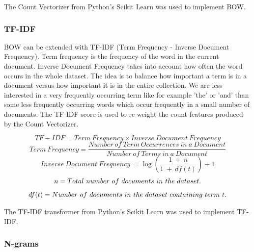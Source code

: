 The Count Vectorizer from Python's Scikit Learn was used to implement BOW. 

\subsubsection{TF-IDF}

BOW can be extended with TF-IDF (Term Frequency - Inverse Document Frequency). Term frequency is the frequency of the word in the current document. Inverse Document Frequency takes into account how often the word occurs in the whole dataset. The idea is to balance how important a term is in a document versus how important it is in the entire collection. We are less interested in a very frequently occurring term like for example 'the' or 'and' than some less frequently occurring words which occur frequently in a small number of documents. The TF-IDF score is used to re-weight the count features produced by the Count Vectorizer.

\begin{tcolorbox}[title=TF-IDF]
\begin{equation}
    TF-IDF = Term\ Frequency \times Inverse\ Document\ Frequency 
\end{equation}
\begin{equation}
    Term\ Frequency = \frac{Number\ of\ Term\ Occurrences\ in\ a\ Document}{Number\ of\ Terms\ in\ a\ Document}
\end{equation}
\begin{equation}
    Inverse\ Document\ Frequency\ = \log (\frac{1\ +\ n}{1\ +\ df(t)}) + 1 
\end{equation}
\begin{equation}
\notag
    n = Total\ number\ of\ documents\ in\ the\ dataset. 
\end{equation}
\begin{equation}
\notag
    df(t) = Number\ of\ documents\ in\ the\ dataset\ containing\ term\ t.
\end{equation}
\end{tcolorbox}
The TF-IDF transformer from Python's Scikit Learn was used to implement TF-IDF.

\subsubsection*{N-grams}

